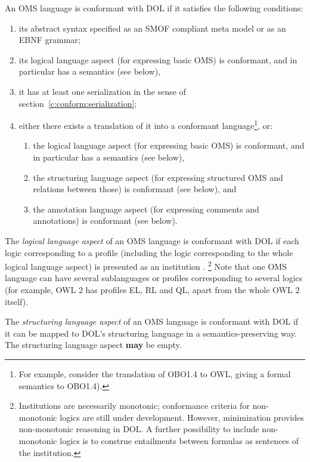 \documentclass[10pt,%
\ifpretendfinal
final%
\else
draft%
\fi,
]{scrreprt}
\newcommand*{\may}{\textbf{may}\xspace}
\begin{document}
An OMS language is conformant with DOL if it satisfies the following conditions:
\begin{enumerate}
\item its abstract syntax specified as an SMOF compliant meta model
or as an EBNF grammar;
\item its logical language aspect (for expressing basic OMS) is conformant,
 and in particular has a semantics (see below),
\item it has at least one serialization in the sense of section~\ref{c:conform:serialization};
\item either there exists a translation of it into a conformant
  language\footnote {For example, consider the translation of OBO1.4
    to OWL, giving a formal semantics to OBO1.4).}, or:
\begin{enumerate}
\item the logical language aspect (for expressing basic OMS) is conformant, and in particular has a semantics (see below),
\item  the
structuring language aspect (for expressing structured OMS and relations
between those) is conformant (see below), and
\item the annotation language aspect (for expressing comments and annotations)
is conformant (see below).
\end{enumerate}
\end{enumerate}


The \emph{logical language aspect} of an OMS language
is %
conformant with DOL if each logic corresponding to a profile (including
the logic corresponding to the whole logical language aspect) is presented as an
institution \cite{GoguenBurstall92}.
\footnote{Institutions are necessarily monotonic;
  conformance criteria for non-monotonic logics are still under
  development. However, minimization provides non-monotonic reasoning
  in DOL. A further possibility to include non-monotonic logics
  is to construe entailments between formulas as sentences of the institution.}
Note that one OMS language can have several sublanguages or profiles 
corresponding to several logics (for example, OWL 2 has profiles
EL, RL and QL, apart from the whole OWL 2 itself).


The \emph{structuring language aspect}  of an OMS language
is conformant with DOL if it can be mapped to DOL's structuring language
in a semantics-preserving way. The structuring language aspect \may be empty.
\end{document}
